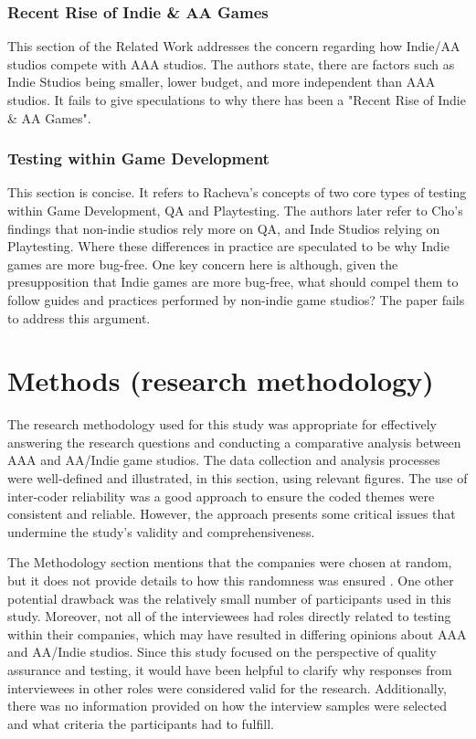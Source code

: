 \documentclass[conference]{IEEEtran}
\begin{document}
\subsubsection{Recent Rise of Indie \& AA Games} This section of the Related Work addresses the concern regarding how Indie/AA studios compete with AAA studios. The authors state, there are factors such as Indie Studios being smaller, lower budget, and more independent than AAA studios. It fails to give speculations to why there has been a "Recent Rise of Indie \& AA Games".\\
\subsubsection{Testing within Game Development} This section is concise. It refers to Racheva's concepts of two core types of testing within Game Development, QA and Playtesting.  
The authors later refer to Cho's findings that non-indie studios rely more on QA, and Inde Studios relying on Playtesting. Where these differences in practice are speculated to be why Indie games are more bug-free.
One key concern here is although, given the presupposition that Indie games are more bug-free, what should compel them to follow guides and practices performed by non-indie game studios? The paper fails to address this argument.




\section{Methods (research methodology)}
The research methodology used for this study was appropriate for effectively answering the research questions and conducting a comparative analysis between AAA and AA/Indie game studios. The data collection and analysis processes were well-defined and illustrated, in this section, using relevant figures. The use of inter-coder reliability was a good approach to ensure the coded themes were consistent and reliable. However, the approach presents some critical issues that undermine the study's validity and comprehensiveness.

The Methodology section mentions that the companies were chosen at random, but it does not provide details to how this randomness was ensured . One other potential drawback was the relatively small number of participants used in this study. Moreover, not all of the interviewees had roles directly related to testing within their companies, which may have resulted in differing opinions about AAA and AA/Indie studios. Since this study focused on the perspective of quality assurance and testing, it would have been helpful to clarify why responses from interviewees in other roles were considered valid for the research. Additionally, there was no information provided on how the interview samples were selected and what criteria the participants had to fulfill.
\end{document}

